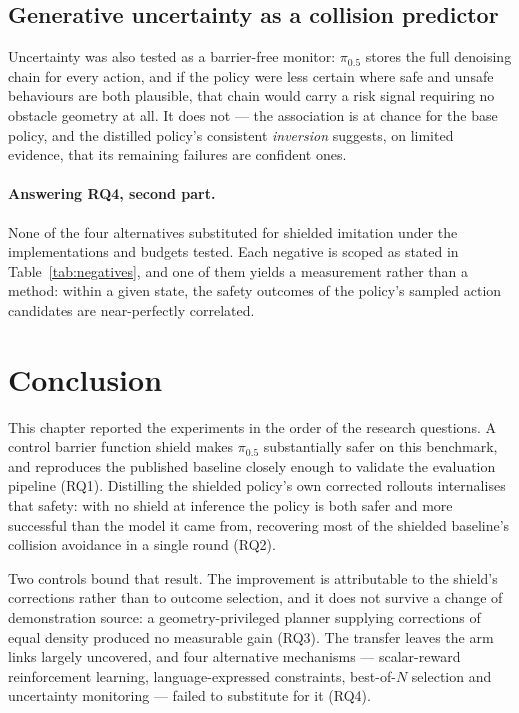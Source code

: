\documentclass[a4paper,11pt]{report}
\begin{document}
\subsection*{Generative uncertainty as a collision predictor}

Uncertainty was also tested as a barrier-free monitor: $\pi_{0.5}$ stores the full denoising chain
for every action, and if the policy were less certain where safe and unsafe behaviours are both
plausible, that chain would carry a risk signal requiring no obstacle geometry at all. It does
not --- the association is at chance for the base policy, and the distilled policy's consistent
\emph{inversion} suggests, on limited evidence, that its remaining failures are confident ones.

\paragraph{Answering RQ4, second part.}
None of the four alternatives substituted for shielded imitation under the implementations and
budgets tested. Each negative is scoped as stated in Table~\ref{tab:negatives}, and one of them
yields a measurement rather than a method: within a given state, the safety outcomes of the
policy's sampled action candidates are near-perfectly correlated.

\section{Conclusion}\label{sec:res:conclusion}

This chapter reported the experiments in the order of the research questions. A control barrier
function shield makes $\pi_{0.5}$ substantially safer on this benchmark, and reproduces the
published baseline closely enough to validate the evaluation pipeline (RQ1). Distilling the
shielded policy's own corrected rollouts internalises that safety: with no shield at inference the
policy is both safer and more successful than the model it came from, recovering most of the
shielded baseline's collision avoidance in a single round (RQ2).

Two controls bound that result. The improvement is attributable to the shield's corrections rather
than to outcome selection, and it does not survive a change of demonstration source: a
geometry-privileged planner supplying corrections of equal density produced no measurable gain
(RQ3). The transfer leaves the arm links largely uncovered, and four alternative mechanisms --- 
scalar-reward reinforcement learning, language-expressed constraints, best-of-$N$ selection and
uncertainty monitoring --- failed to substitute for it (RQ4).
\end{document}
